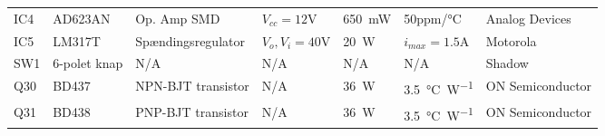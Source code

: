 \begin{table}[h!]
\begin{threeparttable}
\begin{tabular}{ l l l l l l l }
IC4 & AD623AN & Op. Amp SMD & $V_{cc} = 12 \si{\volt}$ & \SI{650}{\milli\watt} & 50ppm/\si{\celsius} & Analog Devices \\
IC5 & LM317T & Spændingsregulator & $V_{o} , V_{i} = 40 \si{\volt}$ & \SI{20}{\watt} & $i_{max} = 1.5 \si{\ampere}$ & Motorola \\
SW1 & 6-polet knap & N/A & N/A & N/A & N/A & Shadow \\
Q30 & BD437 & NPN-BJT transistor & N/A & \SI{36}{\watt} & \SI{3.5}{\celsius\per\watt} & ON Semiconductor \\
Q31 & BD438 & PNP-BJT transistor & N/A & \SI{36}{\watt} & \SI{3.5}{\celsius\per\watt} & ON Semiconductor \\

\hline
\bottomrule
\end{tabular}
\end{threeparttable}
\end{table} 